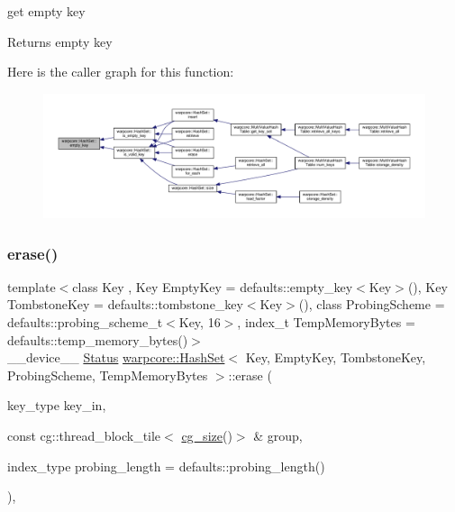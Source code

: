 get empty key 

\begin{DoxyReturn}{Returns}
empty key 
\end{DoxyReturn}
Here is the caller graph for this function\+:
\nopagebreak
\begin{figure}[H]
\begin{center}
\leavevmode
\includegraphics[width=350pt]{classwarpcore_1_1HashSet_a6800547cc8ee14db6d97728af29b53fb_icgraph}
\end{center}
\end{figure}
\mbox{\label{classwarpcore_1_1HashSet_a255b77ba7f1ba8a1faabddfd92ae976c}} 
\subsubsection{\texorpdfstring{erase()}{erase()}\hspace{0.1cm}{\footnotesize\ttfamily [1/2]}}
{\footnotesize\ttfamily template$<$class Key , Key Empty\+Key = defaults\+::empty\+\_\+key$<$\+Key$>$(), Key Tombstone\+Key = defaults\+::tombstone\+\_\+key$<$\+Key$>$(), class Probing\+Scheme  = defaults\+::probing\+\_\+scheme\+\_\+t$<$\+Key, 16$>$, index\+\_\+t Temp\+Memory\+Bytes = defaults\+::temp\+\_\+memory\+\_\+bytes()$>$ \\
\+\_\+\+\_\+device\+\_\+\+\_\+ \hyperlink{classwarpcore_1_1Status}{Status} \hyperlink{classwarpcore_1_1HashSet}{warpcore\+::\+Hash\+Set}$<$ Key, Empty\+Key, Tombstone\+Key, Probing\+Scheme, Temp\+Memory\+Bytes $>$\+::erase (\begin{DoxyParamCaption}\item[{key\+\_\+type}]{key\+\_\+in,  }\item[{const cg\+::thread\+\_\+block\+\_\+tile$<$ \hyperlink{classwarpcore_1_1HashSet_a0906259ae0be4a4f6f9ba74b4874e542}{cg\+\_\+size}()$>$ \&}]{group,  }\item[{index\+\_\+type}]{probing\+\_\+length = {\ttfamily defaults\+:\+:probing\+\_\+length()} }\end{DoxyParamCaption})\hspace{0.3cm}{\ttfamily [inline]}, {\ttfamily [noexcept]}}



